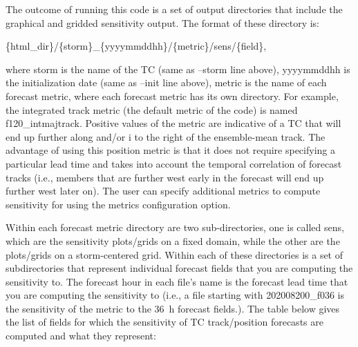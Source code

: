 \documentclass[psfig,12pt]{article}
\begin{document}
The outcome of running this code is a set of output directories that include the graphical and 
gridded sensitivity output.  The format of these directory is:

\vspace{0.1in}
\{html\_dir\}/\{storm\}\_\{yyyymmddhh\}/\{metric\}/sens/\{field\},
\vspace{0.1in}

where storm is the name of the TC (same as --storm line above), yyyymmddhh is the initialization date
(same as --init line above), metric is the name of each forecast metric, where each forecast metric has its own
directory.  For example, the integrated track metric (the default metric of the code) is named 
f120\_intmajtrack.  Positive values of the metric are indicative of a TC that will end up further along and/or i
to the right of the ensemble-mean track.  The advantage of using this position metric is that it does not 
require specifying a particular lead time and takes into account the temporal correlation of forecast tracks 
(i.e., members that are further west early in the forecast will end up further west later on).  The user
can specify additional metrics to compute sensitivity for using the metrics configuration option.

Within each forecast metric directory are two sub-directories, one is called sens,
which are the sensitivity plots/grids on a fixed domain, while the other are the plots/grids on a storm-centered
grid.  Within each of these directories is a set of subdirectories that represent individual
forecast fields that you are computing the sensitivity to.  The forecast hour in each file's name is the
forecast lead time that you are computing the sensitivity to (i.e., a file starting with 202008200\_f036 is 
the sensitivity of the metric to the 36~h forecast fields.).  The table below gives the list of fields
for which the sensitivity of TC track/position forecasts are computed and what they represent:
\end{document}
